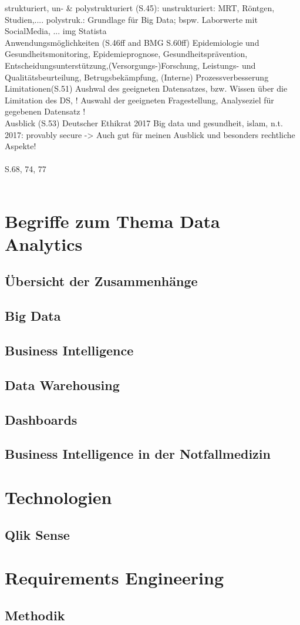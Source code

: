 strukturiert, un- \& polystrukturiert (S.45): 
unstrukturiert: MRT, Röntgen, Studien,....
polystruk.: Grundlage für Big Data; bspw. Laborwerte mit SocialMedia, ...
img Statista\\


Anwendungsmöglichkeiten (S.46ff and BMG S.60ff) Epidemiologie und Gesundheitsmonitoring, Epidemieprognose, Gesundheitsprävention, Entscheidungsunterstützung,(Versorgungs-)Forschung, Leistungs- und Qualitätsbeurteilung, Betrugsbekämpfung, (Interne) Prozessverbesserung 
\\

Limitationen(S.51) Aushwal des geeigneten Datensatzes, bzw. Wissen über die Limitation des DS, ! Auswahl der geeigneten Fragestellung, Analyseziel für gegebenen Datensatz !\\

Ausblick (S.53)  Deutscher Ethikrat 2017 Big data und gesundheit, islam, n.t. 2017: provably secure -> Auch gut für meinen Ausblick und besonders rechtliche Aspekte!\\ \\


S.68, 74, 77 \\ \\



\section{Begriffe zum Thema Data Analytics}
\subsection{Übersicht der Zusammenhänge}
\subsection{Big Data}
\subsection{Business Intelligence}
\subsection{Data Warehousing}
\subsection{Dashboards}
\subsection{Business Intelligence in der Notfallmedizin}

\section{Technologien}
\subsection{Qlik Sense}

\section{Requirements Engineering}
\subsection{Methodik}